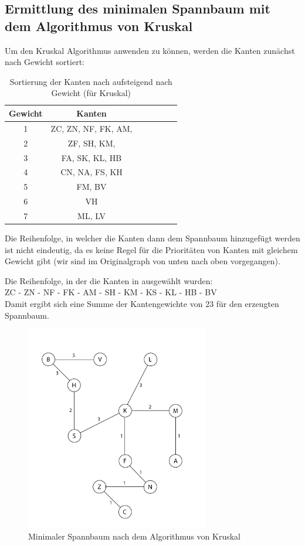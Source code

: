 \documentclass[12pt]{amsart}
\begin{document}
\subsection*{Ermittlung des minimalen Spannbaum mit dem Algorithmus von Kruskal}

Um den Kruskal Algorithmus anwenden zu können, werden die Kanten zunächst nach Gewicht sortiert:
\begin{table}[h]
   \centering
   \begin{tabular}{@{} ccccccc @{}} %
      \toprule
      	Gewicht & Kanten \\
      \midrule
      	1 & ZC, ZN, NF, FK, AM, \\
	2 & ZF, SH, KM, \\
	3 & FA, SK, KL, HB \\
	4 & CN, NA, FS, KH \\
	5 & FM, BV \\
	6 & VH \\
	7 & ML, LV \\
      \bottomrule
   \end{tabular}
   \caption{Sortierung der Kanten nach aufsteigend nach Gewicht (für Kruskal)}
   \label{tab:booktabs}
\end{table}

Die Reihenfolge, in welcher die Kanten dann dem Spannbaum hinzugefügt werden ist nicht eindeutig, da es keine Regel für die Prioritäten von Kanten mit gleichem Gewicht gibt (wir sind im Originalgraph von unten nach oben vorgegangen).

Die Reihenfolge, in der die Kanten in ausgewählt wurden: \\
ZC - ZN - NF - FK - AM - SH - KM - KS - KL - HB - BV \\

Damit ergibt sich eine Summe der Kantengewichte von 23 für den erzeugten Spannbaum.

\begin{figure}[h] %
   \centering
   \includegraphics[width=8cm]{prim.png} 
   \caption{Minimaler Spannbaum nach dem Algorithmus von Kruskal}
   \label{fig:example}
\end{figure}
\end{document}
